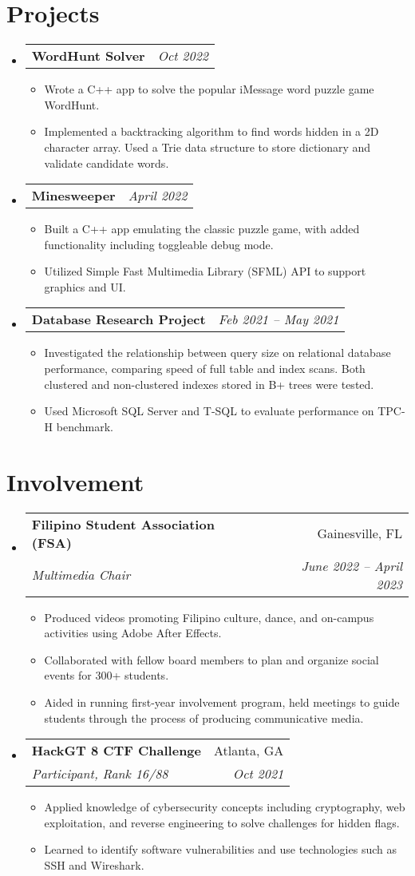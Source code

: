 \documentclass[letterpaper,11pt]{article}
\makeatletter
\newcommand{\resumeItemExperience}[1]{
  \item\small{
    {#1 \vspace{-2pt}}
  }
}
\newcommand{\resumeSubheading}[4]{
  \vspace{-1pt}\item
    \begin{tabular*}{0.97\textwidth}{l@{\extracolsep{\fill}}r}
      \textbf{#1} & #2 \\
      \textit{\small#3} & \textit{\small #4} \\
    \end{tabular*}\vspace{-6pt}
}
\newcommand{\resumeSubheadingProject}[2]{
  \vspace{-1pt}\item
    \begin{tabular*}{0.97\textwidth}{l@{\extracolsep{\fill}}r}
      \textbf{#1} & \textit{\small #2} \\
    \end{tabular*}\vspace{-5pt}
}
\newcommand{\resumeSubHeadingListStart}{\begin{itemize}[leftmargin=*, label={}]}
\newcommand{\resumeSubHeadingListEnd}{\end{itemize}}
\newcommand{\resumeItemListStart}{\begin{itemize}}
\newcommand{\resumeItemListEnd}{\end{itemize}\vspace{-5pt}}
\makeatother
\begin{document}
\section{Projects}
  \resumeSubHeadingListStart
        \resumeSubheadingProject
          {WordHunt Solver}{Oct 2022}
          \resumeItemListStart
            \resumeItemExperience
              {Wrote a C++ app to solve the popular iMessage word puzzle game WordHunt.}
            \resumeItemExperience
              {Implemented a backtracking algorithm to find words hidden in a 2D character array. Used a Trie data structure to store dictionary and validate candidate words.}
          \resumeItemListEnd
        \resumeSubheadingProject
          {Minesweeper}{April 2022}
          \resumeItemListStart
            \resumeItemExperience
              {Built a C++ app emulating the classic puzzle game, with added functionality including toggleable debug mode.}
            \resumeItemExperience
              {Utilized Simple Fast Multimedia Library (SFML) API to support graphics and UI.}
          \resumeItemListEnd
          \resumeSubheadingProject
          {Database Research Project}{Feb 2021 -- May 2021}
          \resumeItemListStart
            \resumeItemExperience
              {Investigated the relationship between query size on relational database performance, comparing speed of full table and index scans. Both clustered and non-clustered indexes stored in B+ trees were tested.}
            \resumeItemExperience
              {Used Microsoft SQL Server and T-SQL to evaluate performance on TPC-H benchmark.}
          \resumeItemListEnd
    \resumeSubHeadingListEnd
    
\section{Involvement}
    \resumeSubHeadingListStart
      \resumeSubheading
        {Filipino Student Association (FSA)}{Gainesville, FL}
        {Multimedia Chair}{June 2022 -- April 2023}
        \resumeItemListStart
          \resumeItemExperience
            {Produced videos promoting Filipino culture, dance, and on-campus activities using Adobe After Effects.}
          \resumeItemExperience
            {Collaborated with fellow board members to plan and organize social events for 300+ students.}
          \resumeItemExperience
            {Aided in running first-year involvement program, held meetings to guide students through the process of producing communicative media.}
        \resumeItemListEnd
      \resumeSubheading
        {HackGT 8 CTF Challenge}{Atlanta, GA}
        {Participant, Rank 16/88}{Oct 2021}
        \resumeItemListStart
          \resumeItemExperience
            {Applied knowledge of cybersecurity concepts including cryptography, web exploitation, and reverse engineering to solve challenges for hidden flags.}
             \resumeItemExperience
            {Learned to identify software vulnerabilities and use technologies such as SSH and Wireshark.}
        \resumeItemListEnd
    \resumeSubHeadingListEnd
          
\end{document}
